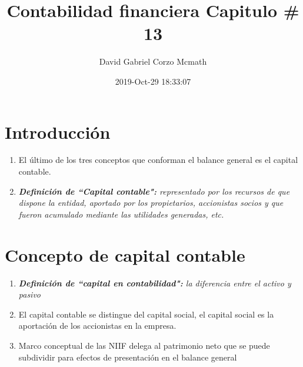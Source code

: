 \documentclass{article}
\title{Contabilidad financiera Capitulo \# 13}
\author{David Gabriel Corzo Mcmath}
\date{2019-Oct-29 18:33:07}
\begin{document}
\maketitle


\section{Introducción}
\begin{enumerate}
    \item El último de los tres conceptos que conforman el balance general es el capital contable.
    \item \emph{\textbf{Definición de ``Capital contable":} representado por los recursos de que dispone la entidad, aportado por los propietarios, accionistas socios y que fueron acumulado mediante las utilidades generadas, etc.}
\end{enumerate}

\section{Concepto de capital contable}
\begin{enumerate}
    \item \emph{\textbf{Definición de ``capital en contabilidad":} la diferencia entre el activo y pasivo}
    \item El capital contable se distingue del capital social, el capital social es la aportación de los accionistas en la empresa.
    \item Marco conceptual de las NIIF delega al patrimonio neto que se puede subdividir para efectos de presentación en el balance general
\end{enumerate}
\end{document}
